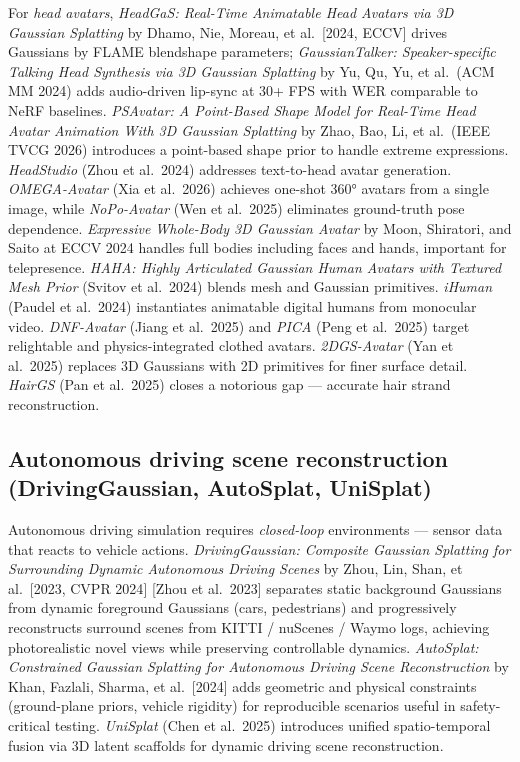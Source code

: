 \documentclass{article}
\begin{document}
For \emph{head avatars}, \emph{HeadGaS: Real-Time Animatable Head Avatars via 3D Gaussian Splatting} by Dhamo, Nie, Moreau, et al.~{[}2024, ECCV{]} drives Gaussians by FLAME blendshape parameters; \emph{GaussianTalker: Speaker-specific Talking Head Synthesis via 3D Gaussian Splatting} by Yu, Qu, Yu, et al.~(ACM MM 2024) \cite{yu2024mipsplattingaliasf} adds audio-driven lip-sync at \(30\)+ FPS with WER comparable to NeRF baselines. \emph{PSAvatar: A Point-Based Shape Model for Real-Time Head Avatar Animation With 3D Gaussian Splatting} by Zhao, Bao, Li, et al.~(IEEE TVCG 2026) \cite{zhao2026psavatarapointbase} introduces a point-based shape prior to handle extreme expressions. \emph{HeadStudio} (Zhou et al.~2024) addresses text-to-head avatar generation. \emph{OMEGA-Avatar} (Xia et al.~2026) achieves one-shot 360° avatars from a single image, while \emph{NoPo-Avatar} (Wen et al.~2025) eliminates ground-truth pose dependence. \emph{Expressive Whole-Body 3D Gaussian Avatar} by Moon, Shiratori, and Saito at ECCV 2024 \cite{moon2024expressivewholebod} handles full bodies including faces and hands, important for telepresence. \emph{HAHA: Highly Articulated Gaussian Human Avatars with Textured Mesh Prior} (Svitov et al.~2024) blends mesh and Gaussian primitives. \emph{iHuman} (Paudel et al.~2024) instantiates animatable digital humans from monocular video. \emph{DNF-Avatar} (Jiang et al.~2025) and \emph{PICA} (Peng et al.~2025) target relightable and physics-integrated clothed avatars. \emph{2DGS-Avatar} (Yan et al.~2025) replaces 3D Gaussians with 2D primitives for finer surface detail. \emph{HairGS} (Pan et al.~2025) closes a notorious gap --- accurate hair strand reconstruction.

\subsection{Autonomous driving scene reconstruction (DrivingGaussian, AutoSplat, UniSplat)}\label{autonomous-driving-scene-reconstruction-drivinggaussian-autosplat-unisplat}

Autonomous driving simulation requires \emph{closed-loop} environments --- sensor data that reacts to vehicle actions. \emph{DrivingGaussian: Composite Gaussian Splatting for Surrounding Dynamic Autonomous Driving Scenes} by Zhou, Lin, Shan, et al.~{[}2023, CVPR 2024{]} {[}Zhou et al.~2023{]} separates static background Gaussians from dynamic foreground Gaussians (cars, pedestrians) and progressively reconstructs surround scenes from KITTI / nuScenes / Waymo logs, achieving photorealistic novel views while preserving controllable dynamics. \emph{AutoSplat: Constrained Gaussian Splatting for Autonomous Driving Scene Reconstruction} by Khan, Fazlali, Sharma, et al.~{[}2024{]} \cite{khan2024autosplatconstrain} adds geometric and physical constraints (ground-plane priors, vehicle rigidity) for reproducible scenarios useful in safety-critical testing. \emph{UniSplat} (Chen et al.~2025) introduces unified spatio-temporal fusion via 3D latent scaffolds for dynamic driving scene reconstruction.
\end{document}
